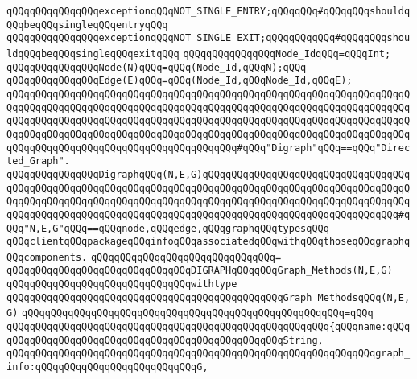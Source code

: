 \verb|qQQqqQQqqQQqqQQqexceptionqQQqNOT_SINGLE_ENTRY;qQQqqQQq#qQQqqQQqshouldqQQqbeqQQqsingleqQQqentryqQQq|\newline
\verb|qQQqqQQqqQQqqQQqexceptionqQQqNOT_SINGLE_EXIT;qQQqqQQqqQQq#qQQqqQQqshouldqQQqbeqQQqsingleqQQqexitqQQq|\newline
\newline
\newline
\verb|qQQqqQQqqQQqqQQqNode_IdqQQq=qQQqInt;|\newline
\verb|qQQqqQQqqQQqqQQqNode(N)qQQq=qQQq(Node_Id,qQQqN);qQQq|\newline
\verb|qQQqqQQqqQQqqQQqEdge(E)qQQq=qQQq(Node_Id,qQQqNode_Id,qQQqE);|\newline
\newline
\verb|qQQqqQQqqQQqqQQqqQQqqQQqqQQqqQQqqQQqqQQqqQQqqQQqqQQqqQQqqQQqqQQqqQQqqQQqqQQqqQQqqQQqqQQqqQQqqQQqqQQqqQQqqQQqqQQqqQQqqQQqqQQqqQQqqQQqqQQqqQQqqQQqqQQqqQQqqQQqqQQqqQQqqQQqqQQqqQQqqQQqqQQqqQQqqQQqqQQqqQQqqQQqqQQqqQQqqQQqqQQqqQQqqQQqqQQqqQQqqQQqqQQqqQQqqQQqqQQqqQQqqQQqqQQqqQQqqQQqqQQqqQQqqQQqqQQqqQQqqQQqqQQqqQQqqQQqqQQqqQQq#qQQq"Digraph"qQQq==qQQq"Directed_Graph".|\newline
\verb|qQQqqQQqqQQqqQQqDigraphqQQq(N,E,G)qQQqqQQqqQQqqQQqqQQqqQQqqQQqqQQqqQQqqQQqqQQqqQQqqQQqqQQqqQQqqQQqqQQqqQQqqQQqqQQqqQQqqQQqqQQqqQQqqQQqqQQqqQQqqQQqqQQqqQQqqQQqqQQqqQQqqQQqqQQqqQQqqQQqqQQqqQQqqQQqqQQqqQQqqQQqqQQqqQQqqQQqqQQqqQQqqQQqqQQqqQQqqQQqqQQqqQQqqQQqqQQqqQQqqQQqqQQqqQQqqQQq#qQQq"N,E,G"qQQq==qQQqnode,qQQqedge,qQQqgraphqQQqtypesqQQq--qQQqclientqQQqpackageqQQqinfoqQQqassociatedqQQqwithqQQqthoseqQQqgraphqQQqcomponents.|\newline
\verb|qQQqqQQqqQQqqQQqqQQqqQQqqQQqqQQq=|\newline
\verb|qQQqqQQqqQQqqQQqqQQqqQQqqQQqqQQqDIGRAPHqQQqqQQqGraph_Methods(N,E,G)|\newline
\verb|qQQqqQQqqQQqqQQqqQQqqQQqqQQqqQQqwithtype|\newline
\verb|qQQqqQQqqQQqqQQqqQQqqQQqqQQqqQQqqQQqqQQqqQQqqQQqGraph_MethodsqQQq(N,E,G)|\newline
\verb|qQQqqQQqqQQqqQQqqQQqqQQqqQQqqQQqqQQqqQQqqQQqqQQqqQQqqQQq=qQQq|\newline
\verb|qQQqqQQqqQQqqQQqqQQqqQQqqQQqqQQqqQQqqQQqqQQqqQQqqQQqqQQq{qQQqname:qQQqqQQqqQQqqQQqqQQqqQQqqQQqqQQqqQQqqQQqqQQqqQQqqQQqString,|\newline
\verb|qQQqqQQqqQQqqQQqqQQqqQQqqQQqqQQqqQQqqQQqqQQqqQQqqQQqqQQqqQQqqQQqgraph_info:qQQqqQQqqQQqqQQqqQQqqQQqqQQqG,|\newline
\newline
